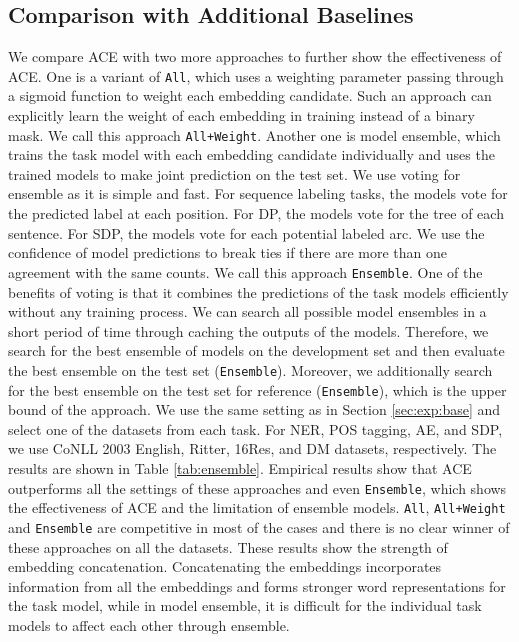 \documentclass{article} \usepackage{iclr2021_conference,times}
\begin{document}
\subsection{Comparison with Additional Baselines}
\label{sec:ensemble}
We compare ACE with two more approaches to further show the effectiveness of ACE. One is a variant of \texttt{All}, which uses a weighting parameter  passing through a sigmoid function to weight each embedding candidate. Such an approach can explicitly learn the weight of each embedding in training instead of a binary mask. We call this approach \texttt{All+Weight}. Another one is model ensemble, which trains the task model with each embedding candidate individually and uses the trained models to make joint prediction on the test set. We use voting for ensemble as it is simple and fast. For sequence labeling tasks, the models vote for the predicted label at each position. For DP, the models vote for the tree of each sentence. For SDP, the models vote for each potential labeled arc. We use the confidence of model predictions to break ties if there are more than one agreement with the same counts. We call this approach \texttt{Ensemble}. One of the benefits of voting is that it combines the predictions of the task models efficiently without any training process. We can search all possible  model ensembles in a short period of time through caching the outputs of the models. Therefore, we search for the best ensemble of models on the development set and then evaluate the best ensemble on the test set (\texttt{Ensemble}). Moreover, we additionally search for the best ensemble on the test set for reference (\texttt{Ensemble}), which is the upper bound of the approach. We use the same setting as in Section \ref{sec:exp:base} and select one of the datasets from each task. For NER, POS tagging, AE, and SDP, we use CoNLL 2003 English, Ritter, 16Res, and DM datasets, respectively. The results are shown in Table \ref{tab:ensemble}. Empirical results show that ACE outperforms all the settings of these approaches and even \texttt{Ensemble}, which shows the effectiveness of ACE and the limitation of ensemble models. \texttt{All}, \texttt{All+Weight} and \texttt{Ensemble} are competitive in most of the cases and there is no clear winner of these approaches on all the datasets. These results show the strength of embedding concatenation. Concatenating the embeddings incorporates information from all the embeddings and forms stronger word representations for the task model, while in model ensemble, it is difficult for the individual task models to affect each other through ensemble.
\end{document}
